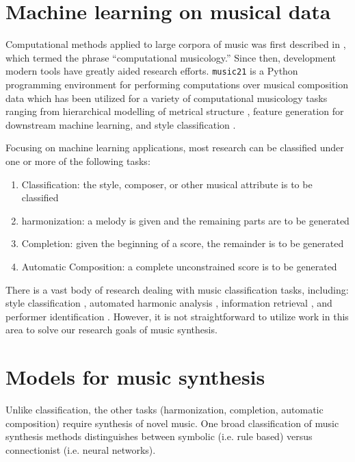\section{Machine learning on musical data}

Computational methods applied to large corpora of music was first described in
\citep{coutinho2005computational}, which termed the phrase ``computational
musicology.'' Since then, development modern tools have greatly aided research
efforts. \texttt{music21} \citep{Scott2015} is a Python programming environment
for performing computations over musical composition data which has been
utilized for a variety of computational musicology tasks ranging from
hierarchical modelling of metrical structure \citep{ariza2010modeling}, feature
generation for downstream machine learning\citep{Cuthbert2011}, and style
classification \citep{Herlands2014}.

Focusing on machine learning applications, most research can be
classified under one or more of the following tasks:
\begin{enumerate}
  \item Classification: the style, composer, or other musical attribute is to be classified
  \item harmonization: a melody is given and the remaining parts are to be generated
  \item Completion: given the beginning of a score, the remainder is to be generated
  \item Automatic Composition: a complete unconstrained score is to be generated
\end{enumerate}

There is a vast body of research dealing with music classification tasks,
including: style classification \citep{Herlands2014}
\citep{dannenberg1997machine}, automated harmonic analysis \cite{ni2012end},
information retrieval \citep{mandel2006support}, and performer identification
\citep{stamatatos2005automatic}. However, it is not straightforward to utilize
work in this area to solve our research goals of music synthesis.

\section{Models for music synthesis}

Unlike classification, the other tasks (harmonization, completion, automatic
composition) require synthesis of novel music. One broad classification of
music synthesis methods \citep{toiviainen2000symbolic} distinguishes between
symbolic (i.e. rule based) versus connectionist (i.e. neural networks).

